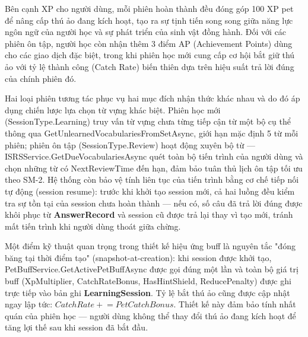 Bên cạnh XP cho người dùng, mỗi phiên hoàn thành đều đóng góp 100 XP pet để nâng cấp thú ảo đang kích hoạt, tạo ra sự tịnh tiến song song giữa năng lực ngôn ngữ của người học và sự phát triển của sinh vật đồng hành. Đối với các phiên ôn tập, người học còn nhận thêm 3 điểm AP (Achievement Points) dùng cho các giao dịch đặc biệt, trong khi phiên học mới cung cấp cơ hội bắt giữ thú ảo với tỷ lệ thành công (Catch Rate) biến thiên dựa trên hiệu suất trả lời đúng của chính phiên đó.

Hai loại phiên tương tác phục vụ hai mục đích nhận thức khác nhau và do đó áp dụng chiến lược lựa chọn từ vựng khác biệt. Phiên học mới (SessionType.Learning) truy vấn từ vựng chưa từng tiếp cận từ một bộ cụ thể thông qua GetUnlearnedVocabulariesFromSetAsync, giới hạn mặc định 5 từ mỗi phiên; phiên ôn tập (SessionType.Review) hoạt động xuyên bộ từ — ISRSService.GetDueVocabulariesAsync quét toàn bộ tiến trình của người dùng và chọn những từ có NextReviewTime đến hạn, đảm bảo tuân thủ lịch ôn tập tối ưu theo SM-2. Hệ thống còn bảo vệ tính liên tục của tiến trình bằng cơ chế tiếp nối tự động (session resume): trước khi khởi tạo session mới, cả hai luồng đều kiểm tra sự tồn tại của session chưa hoàn thành — nếu có, số câu đã trả lời đúng được khôi phục từ \textbf{AnswerRecord} và session cũ được trả lại thay vì tạo mới, tránh mất tiến trình khi người dùng thoát giữa chừng.

Một điểm kỹ thuật quan trọng trong thiết kế hiệu ứng buff là nguyên tắc "đóng băng tại thời điểm tạo" (snapshot-at-creation): khi session được khởi tạo, PetBuffService.GetActivePetBuffAsync được gọi đúng một lần và toàn bộ giá trị buff (XpMultiplier, CatchRateBonus, HasHintShield, ReducePenalty) được ghi trực tiếp vào bản ghi \textbf{LearningSession}. Tỷ lệ bắt thú ảo cũng được cập nhật ngay lập tức: $CatchRate \mathrel{+}= PetCatchBonus$. Thiết kế này đảm bảo tính nhất quán của phiên học — người dùng không thể thay đổi thú ảo đang kích hoạt để tăng lợi thế sau khi session đã bắt đầu.

